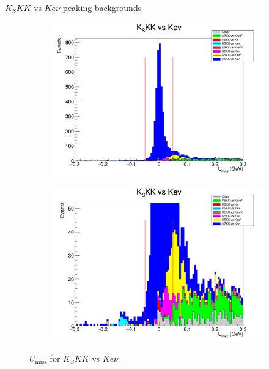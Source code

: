 \documentclass{beamer}
\begin{document}
\begin{frame}{$K_SKK$ vs $Ke\nu$ peaking backgrounds}
  \begin{figure}
    \centering
    \begin{subfigure}{0.5\textwidth}
      \centering
      \includegraphics[width=\textwidth]{KSKKVersusKeNuPeaking.png}
    \end{subfigure}%
    \begin{subfigure}{0.5\textwidth}
      \centering
      \includegraphics[width=\textwidth]{KSKKVersusKeNuPeaking2.png}
    \end{subfigure}
    \caption{$U_\text{miss}$ for $K_SKK$ vs $Ke\nu$}
  \end{figure}
\end{frame}
\end{document}
